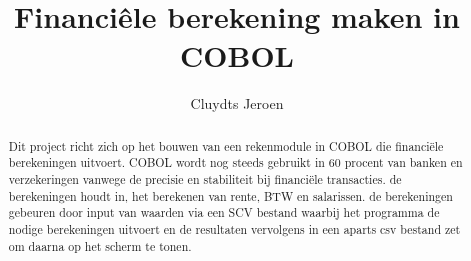 \documentclass{hogent-article}
\title{Financiêle berekening maken in COBOL}
\author{Cluydts Jeroen}
\begin{document}
\begin{abstract}
  Dit project richt zich op het bouwen van een rekenmodule in COBOL die financiële berekeningen uitvoert. COBOL wordt nog steeds gebruikt in 60 procent van banken en verzekeringen vanwege de precisie en stabiliteit bij financiële transacties. de berekeningen houdt in, het berekenen van rente, BTW en salarissen. de berekeningen gebeuren door input van waarden via een SCV bestand waarbij het programma de nodige berekeningen uitvoert en de resultaten vervolgens in een aparts csv bestand zet om daarna op het scherm te tonen.
\end{abstract}

\tableofcontents



\printbibliography[heading=bibintoc]
\end{document}
